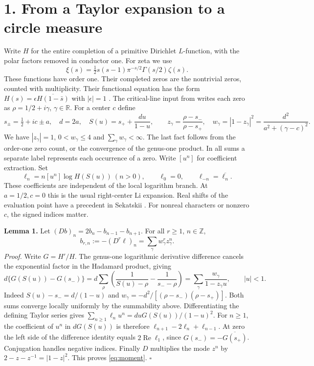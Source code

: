 \documentclass[11pt,letterpaper]{article}
\newcommand{\HH}[1]{\section*{\color{ink}#1}}
\DeclareMathOperator{\Rea}{Re}
\newcommand{\Z}{\mathbb Z}
\newcommand{\R}{\mathbb R}
\begin{document}
\newpage
\HH{1. From a Taylor expansion to a circle measure}
Write $H$ for the entire completion of a primitive Dirichlet $L$-function,
with the polar factors removed in conductor one. For zeta we use\[\xi(s)=\tfrac12 s(s-1)\pi^{-s/2}\Gamma(s/2)\zeta(s).\]
These functions have order one. Their completed zeros are the nontrivial
zeros, counted with multiplicity. Their functional equation has the form
$H(s)=\epsilon\overline{H(1-\bar s)}$ with $|\epsilon|=1$ \cite{lagarias}.
The critical-line input from \cite{lean} writes each zero as
$\rho=1/2+i\gamma$, $\gamma\in\R$. For a center $c$ define
\[
 s_\pm=\tfrac12+ic\pm a,\quad d=2a,\quad S(u)=s_++\frac{du}{1-u},
 \qquad z_\gamma=\frac{\rho-s_-}{\rho-s_+},\quad
 w_\gamma=|1-z_\gamma|^2=\frac{d^2}{a^2+(\gamma-c)^2}.
\]
We have $|z_\gamma|=1$, $0<w_\gamma\le4$ and $\sum_\gamma w_\gamma<\infty$.
The last fact follows from the order-one zero count, or the convergence
of the genus-one product. In all sums a separate label represents each
occurrence of a zero. Write $[u^n]$ for coefficient extraction. Set
\[
 \ell_n=n[u^n]\log H(S(u))\ (n>0),\qquad
 \ell_0=0,\qquad \ell_{-n}=\overline{\ell_n}.
\]
These coefficients are independent of the local logarithm branch. At
$a=1/2,c=0$ this is the usual right-center Li expansion. Real shifts
of the evaluation point have a precedent in Sekatskii \cite{sek}.
For nonreal characters or nonzero $c$, the signed indices matter.

\textbf{Lemma 1.} Let $(Db)_n=2b_n-b_{n-1}-b_{n+1}$. For all $r\ge1$, $n\in\Z$,
\begin{equation}
 b_{r,n}:=-(D^r\ell)_n=\sum_\gamma w_\gamma^r z_\gamma^n .
 \label{eq:moment}
\end{equation}
\emph{Proof.} Write $G=H'/H$. The genus-one logarithmic derivative
difference cancels the exponential factor in the Hadamard product, giving
\[
 d\{G(S(u))-G(s_-)\}
 =d\sum_\rho\left(\frac1{S(u)-\rho}-\frac1{s_--\rho}\right)
 =\sum_\gamma\frac{w_\gamma}{1-z_\gamma u},\qquad |u|<1 .
\]
Indeed $S(u)-s_-=d/(1-u)$ and
$w_\gamma=-d^2/[(\rho-s_-)(\rho-s_+)]$. Both sums converge locally uniformly
by the summability above. Differentiating the defining Taylor series gives
$\sum_{n\ge1}\ell_n u^n=duG(S(u))/(1-u)^2$.
For $n\ge1$, the coefficient of $u^n$ in $dG(S(u))$ is therefore
$\ell_{n+1}-2\ell_n+\ell_{n-1}$. At zero the left side of the difference
identity equals $2\Rea\ell_1$, since $G(s_-)=-\overline{G(s_+)}$.
Conjugation handles negative indices. Finally $D$ multiplies the mode $z^n$
by $2-z-z^{-1}=|1-z|^2$. This proves \eqref{eq:moment}. \hfill$\square$
\end{document}

